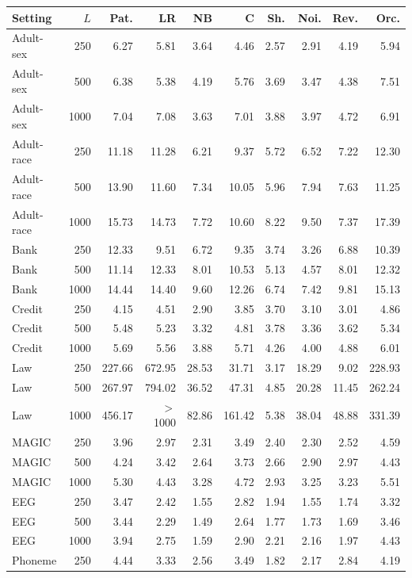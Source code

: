 \begin{tabular}{lrrrrrrrrr}
\toprule
Setting & $L$ & Pat. & LR & NB & C & Sh. & Noi. & Rev. & Orc. \\
\midrule
Adult-sex & 250 & 6.27 & 5.81 & 3.64 & 4.46 & 2.57 & 2.91 & 4.19 & 5.94 \\
Adult-sex & 500 & 6.38 & 5.38 & 4.19 & 5.76 & 3.69 & 3.47 & 4.38 & 7.51 \\
Adult-sex & 1000 & 7.04 & 7.08 & 3.63 & 7.01 & 3.88 & 3.97 & 4.72 & 6.91 \\
Adult-race & 250 & 11.18 & 11.28 & 6.21 & 9.37 & 5.72 & 6.52 & 7.22 & 12.30 \\
Adult-race & 500 & 13.90 & 11.60 & 7.34 & 10.05 & 5.96 & 7.94 & 7.63 & 11.25 \\
Adult-race & 1000 & 15.73 & 14.73 & 7.72 & 10.60 & 8.22 & 9.50 & 7.37 & 17.39 \\
Bank & 250 & 12.33 & 9.51 & 6.72 & 9.35 & 3.74 & 3.26 & 6.88 & 10.39 \\
Bank & 500 & 11.14 & 12.33 & 8.01 & 10.53 & 5.13 & 4.57 & 8.01 & 12.32 \\
Bank & 1000 & 14.44 & 14.40 & 9.60 & 12.26 & 6.74 & 7.42 & 9.81 & 15.13 \\
Credit & 250 & 4.15 & 4.51 & 2.90 & 3.85 & 3.70 & 3.10 & 3.01 & 4.86 \\
Credit & 500 & 5.48 & 5.23 & 3.32 & 4.81 & 3.78 & 3.36 & 3.62 & 5.34 \\
Credit & 1000 & 5.69 & 5.56 & 3.88 & 5.71 & 4.26 & 4.00 & 4.88 & 6.01 \\
Law & 250 & 227.66 & 672.95 & 28.53 & 31.71 & 3.17 & 18.29 & 9.02 & 228.93 \\
Law & 500 & 267.97 & 794.02 & 36.52 & 47.31 & 4.85 & 20.28 & 11.45 & 262.24 \\
Law & 1000 & 456.17 & $>$1000 & 82.86 & 161.42 & 5.38 & 38.04 & 48.88 & 331.39 \\
MAGIC & 250 & 3.96 & 2.97 & 2.31 & 3.49 & 2.40 & 2.30 & 2.52 & 4.59 \\
MAGIC & 500 & 4.24 & 3.42 & 2.64 & 3.73 & 2.66 & 2.90 & 2.97 & 4.43 \\
MAGIC & 1000 & 5.30 & 4.43 & 3.28 & 4.72 & 2.93 & 3.25 & 3.23 & 5.51 \\
EEG & 250 & 3.47 & 2.42 & 1.55 & 2.82 & 1.94 & 1.55 & 1.74 & 3.32 \\
EEG & 500 & 3.44 & 2.29 & 1.49 & 2.64 & 1.77 & 1.73 & 1.69 & 3.46 \\
EEG & 1000 & 3.94 & 2.75 & 1.59 & 2.90 & 2.21 & 2.16 & 1.97 & 4.43 \\
Phoneme & 250 & 4.44 & 3.33 & 2.56 & 3.49 & 1.82 & 2.17 & 2.84 & 4.19 \\

\end{tabular}
